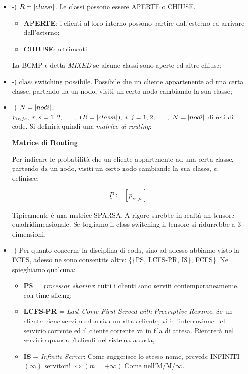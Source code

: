 \begin{itemize}

\item{-)} $R=\left\vert{classi}\right\vert$. Le classi possono essere APERTE o CHIUSE.

\begin{itemize}

\item{\textbf{APERTE}}: i clienti al loro interno possono partire dall'esterno ed arrivare dall'esterno;
\item{\textbf{CHIUSE}}: altrimenti
\end{itemize}

La BCMP è detta \textit{MIXED} se alcune classi sono aperte ed altre chiuse;

\item{-)} class switching possibile. Possibile che un cliente appartenente ad una certa classe, partendo da un nodo, visiti un certo nodo cambiando la sua classe;
\item{-)} $N=\left\vert{nodi}\right\vert$. $p_{ir,js},\ r,s=1,2,\ \dots,\ (R=\cardinality{classi}),\ i,j=1,2,\ \dots,\ N=\cardinality{nodi}$ di reti di code. Si definirà quindi una \textit{matrice di routing}:

\begin{defn}{\textbf{Matrice di Routing}}

Per indicare le probabilità che un cliente appartenente ad una certa classe, partendo da un nodo, visiti un certo nodo cambiando la sua classe, si definisce:

\[
	\underline{\underline{P} := [p_{ir,js}]}
\]

\end{defn}

Tipicamente è una matrice SPARSA. A rigore sarebbe in realtà un tensore quadridimensionale. Se togliamo il class switching il tensore si ridurrebbe a 3 dimensioni.

\item{-)} Per quanto concerne la disciplina di coda, sino ad adesso abbiamo visto la FCFS, adesso ne sono consentite altre: \{\{PS, LCFS-PR, IS\}, FCFS\}. Ne spieghiamo qualcuna:

\begin{itemize}

\item{\textbf{PS} = \textit{processor sharing}}: \underline{tutti i clienti sono serviti contemporaneamente}, con time slicing;
\item{\textbf{LCFS-PR} = \textit{Last-Come-First-Served with Preemptive-Resume}}: Se un cliente viene servito ed arriva un altro cliente, vi è l'interruzione del servizio corrente ed il cliente corrente va in fila di attesa. Rientrerà nel servizio quando $\nexists$ clienti nel sistema a coda;
\item{\textbf{IS} = \textit{Infinite Server}}: Come suggerisce lo stesso nome, prevede INFINITI $(\infty)$ servitori! $\iff (m=+\infty)$ Come nell'M/M/$\infty$.

\end{itemize}

\end{itemize}

